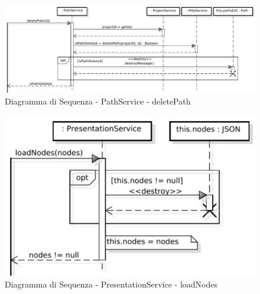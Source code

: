 \begin{center}
\begin{figure}[h]
\centering
\includegraphics[scale=0.33,keepaspectratio]{diagrammi/sequenza/FrontEnd/services/deletePath.pdf}
\caption{Diagramma di Sequenza - PathService - deletePath}
\end{figure}
\end{center}
\FloatBarrier
{}
\begin{center}
\begin{figure}[h]
\centering
\includegraphics[scale=0.33,keepaspectratio]{diagrammi/sequenza/FrontEnd/services/loadNodes.pdf}
\caption{Diagramma di Sequenza - PresentationService - loadNodes}
\end{figure}
\end{center}
